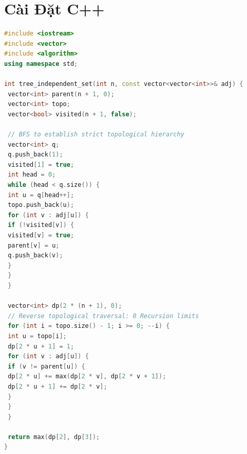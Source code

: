 \documentclass[11pt, letterpaper]{report}
\begin{document}
\section{Cài Đặt C++}
\begin{lstlisting}[language=C++, caption={C++ Flat Array Tree DP (Zero Call-Stack Overhead)}]
#include <iostream>
#include <vector>
#include <algorithm>
using namespace std;

int tree_independent_set(int n, const vector<vector<int>>& adj) {
 vector<int> parent(n + 1, 0);
 vector<int> topo;
 vector<bool> visited(n + 1, false);
 
 // BFS to establish strict topological hierarchy
 vector<int> q;
 q.push_back(1);
 visited[1] = true;
 int head = 0;
 while (head < q.size()) {
 int u = q[head++];
 topo.push_back(u);
 for (int v : adj[u]) {
 if (!visited[v]) {
 visited[v] = true;
 parent[v] = u;
 q.push_back(v);
 }
 }
 }
 
 vector<int> dp(2 * (n + 1), 0);
 // Reverse topological traversal: 0 Recursion limits
 for (int i = topo.size() - 1; i >= 0; --i) {
 int u = topo[i];
 dp[2 * u + 1] = 1;
 for (int v : adj[u]) {
 if (v != parent[u]) {
 dp[2 * u] += max(dp[2 * v], dp[2 * v + 1]);
 dp[2 * u + 1] += dp[2 * v];
 }
 }
 }
 
 return max(dp[2], dp[3]);
}
\end{lstlisting}
\end{document}
